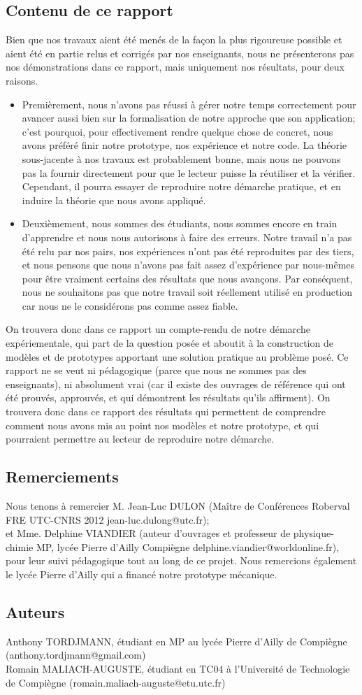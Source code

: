 \subsection{Contenu de ce rapport}
Bien que nos travaux aient été menés de la façon la plus rigoureuse possible et aient été en partie relus et corrigés par nos enseignants, nous ne présenterons pas nos démonstrations dans ce rapport, mais uniquement nos résultats, pour deux raisons.
\begin{itemize}
	\item Premièrement, nous n'avons pas réussi à gérer notre temps correctement pour avancer aussi bien sur la formalisation de notre approche que son application; c'est pourquoi, pour effectivement rendre quelque chose de concret, nous avons préféré finir notre prototype, nos expérience et notre code. La théorie sous-jacente à nos travaux est probablement bonne, mais nous ne pouvons pas la fournir directement pour que le lecteur puisse la réutiliser et la vérifier. Cependant, il pourra essayer de reproduire notre démarche pratique, et en induire la théorie que nous avons appliqué.
	\item Deuxièmement, nous sommes des étudiants, nous sommes encore en train d'apprendre et nous nous autorisons à faire des erreurs. Notre travail n'a pas été relu par nos pairs, nos expériences n'ont pas été reproduites par des tiers, et nous pensons que nous n'avons pas fait assez d'expérience par nous-mêmes pour être vraiment certains des résultats que nous avançons. Par conséquent, nous ne souhaitons pas que notre travail soit réellement utilisé en production car nous ne le considérons pas comme assez fiable.
\end{itemize}
On trouvera donc dans ce rapport un compte-rendu de notre démarche expériementale, qui part de la question posée et aboutit à la construction de modèles et de prototypes apportant une solution pratique au problème posé. Ce rapport ne se veut ni pédagogique (parce que nous ne sommes pas des enseignants), ni absolument vrai (car il existe des ouvrages de référence qui ont été prouvés, approuvés, et qui démontrent les résultats qu'ils affirment). On trouvera donc dans ce rapport des résultats qui permettent de comprendre comment nous avons mis au point nos modèles et notre prototype, et qui pourraient permettre au lecteur de reproduire notre démarche.
\subsection{Remerciements}
Nous tenons à remercier M. Jean-Luc DULON (Maître de Conférences Roberval FRE UTC-CNRS 2012 jean-luc.dulong@utc.fr);\\
et Mme. Delphine VIANDIER (auteur d'ouvrages et professeur de physique-chimie MP, lycée Pierre d'Ailly Compiègne delphine.viandier@worldonline.fr),\\
pour leur suivi pédagogique tout au long de ce projet.
Nous remercions également le lycée Pierre d'Ailly qui a financé notre prototype mécanique.\\
\subsection{Auteurs}
Anthony TORDJMANN, étudiant en MP au lycée Pierre d'Ailly de Compiègne (anthony.tordjmann@gmail.com)\\
Romain MALIACH-AUGUSTE, étudiant en TC04 à l'Université de Technologie de Compiègne (romain.maliach-auguste@etu.utc.fr)
